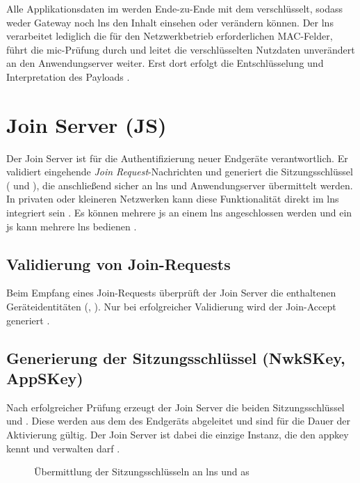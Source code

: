 Alle Applikationsdaten im  werden Ende-zu-Ende mit dem  verschlüsselt, sodass weder Gateway noch \ac{lns} den Inhalt einsehen oder verändern können. Der \ac{lns} verarbeitet lediglich die für den Netzwerkbetrieb erforderlichen MAC-Felder, führt die \ac{mic}-Prüfung durch und leitet die verschlüsselten Nutzdaten unverändert an den Anwendungserver weiter. Erst dort erfolgt die Entschlüsselung und Interpretation des Payloads \cite{LoRaAlliance:2020b, Montagny:2022}. 

\section{Join Server (JS)}
	Der Join Server ist für die Authentifizierung neuer Endgeräte verantwortlich. Er validiert eingehende \textit{Join Request}-Nachrichten und generiert die Sitzungsschlüssel ( und ), die anschlie{\ss}end sicher an \ac{lns} und Anwendungserver übermittelt werden. In privaten oder kleineren Netzwerken kann diese Funktionalität direkt im \ac{lns} integriert sein \cite{Semtech:2024} \cite{LoRaAlliance:2020b}. Es können mehrere \ac{js} an einem \ac{lns} angeschlossen werden und ein \ac{js} kann mehrere \ac{lns} bedienen \cite{LoRaAlliance:2020c}.
\subsection{Validierung von Join-Requests}
	Beim Empfang eines Join-Requests überprüft der Join Server die enthaltenen Geräteidentitäten (, ). Nur bei erfolgreicher Validierung wird der Join-Accept generiert \cite{Semtech:2024, LoRaAlliance:2020c}.
\subsection{Generierung der Sitzungsschlüssel (NwkSKey, AppSKey)}
	Nach erfolgreicher Prüfung erzeugt der Join Server die beiden Sitzungsschlüssel  und . Diese werden aus dem  des Endgeräts abgeleitet und sind für die Dauer der Aktivierung gültig. Der Join Server ist dabei die einzige Instanz, die den \acs{appkey} kennt und verwalten darf \cite{LoRaAlliance:2020c, Montagny:2022}.
	\begin{figure}[H]
		\centering
		\caption{Übermittlung der Sitzungsschlüsseln an \ac{lns} und \ac{as} \cite{Montagny:2022}}
	\end{figure}
